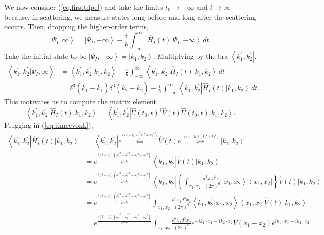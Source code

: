 \documentclass[11pt]{article}
\newcommand{\bra}[1]{\left\langle#1\right|}
\newcommand{\ket}[1]{\left|#1\right\rangle}
\newcommand{\braket}[2]{\left\langle#1|#2\right\rangle}
\newcommand{\op}[1]{\hat{#1}}
\theoremstyle{theorem}
\theoremstyle{remark}
\theoremstyle{step}
\theoremstyle{gap}
\begin{document}
We now consider (\ref{eq.firsttdpe}) and take the limits \(t_0 \to -\infty\) and \(t \to \infty\) because, in scattering, we measure states long before and long after the scattering occurs. Then, dropping the higher-order terms,
\[
\ket{\Psi_I, \infty} = \ket{\Psi_I, -\infty} - \frac{i}{\hbar} \int_{-\infty}^\infty \op{H}_I(t)\ket{\Psi_I, -\infty} \,dt.
\]
Take the initial state to be \(\ket{\Psi_I, -\infty} = \ket{k_1, k_2}\). Multiplying by the bra \(\bra{k_1^\prime, k_2^\prime}\),
\begin{align}
\braket{k_1^\prime, k_2^\prime}{\Psi_I, \infty} &= \braket{k_1^\prime, k_2^\prime}{k_1, k_2} - \frac{i}{\hbar} \int_{-\infty}^\infty \bra{k_1^\prime, k_2^\prime} \op{H}_I(t)\ket{k_1, k_2} \,dt \nonumber\\
&= \delta^3(k_1^\prime - k_1)\delta^3(k_2^\prime - k_2) - \frac{i}{\hbar} \int_{-\infty}^\infty \bra{k_1^\prime, k_2^\prime} \op{H}_I(t)\ket{k_1, k_2} \,dt. \label{eq.intermed}
\end{align}
This motivates us to compute the matrix element
\[
\bra{k_1^\prime, k_2^\prime} \op{H}_I(t)\ket{k_1, k_2} = \bra{k_1^\prime, k_2^\prime} \op{U}(t_0, t)^\dagger \op{V}(t) \op{U}(t_0, t) \ket{k_1, k_2}.
\]
Plugging in (\ref{eq.timeevonk}),
\begin{align*}
\bra{k_1^\prime, k_2^\prime} \op{H}_I(t)\ket{k_1, k_2} &= \bra{k_1^\prime, k_2^\prime} e^{\frac{i\left(t-t_0\right)\left({k_1^\prime}^2 + {k_2^\prime}^2\right)}{2m\hbar}} \op{V}(t) e^{\frac{-i\left(t-t_0\right)\left({k_1}^2 + {k_2}^2\right)}{2m\hbar}} \ket{k_1, k_2} \\
&= e^{\frac{i\left(t-t_0\right)\left({k_1^\prime}^2 + {k_2^\prime}^2 - {k_1}^2 - {k_2}^2\right)}{2m\hbar}} \bra{k_1^\prime, k_2^\prime} \op{V}(t) \ket{k_1, k_2} \\
&= e^{\frac{i\left(t-t_0\right)\left({k_1^\prime}^2 + {k_2^\prime}^2 - {k_1}^2 - {k_2}^2\right)}{2m\hbar}} \bra{k_1^\prime, k_2^\prime} \left\{\int_{x_1, x_2} \frac{d^3 x_1 d^3 x_2}{(2\pi)^6}\ket{x_1, x_2}\bra{x_1, x_2}\right\}\op{V}(t) \ket{k_1, k_2} \\
&= e^{\frac{i\left(t-t_0\right)\left({k_1^\prime}^2 + {k_2^\prime}^2 - {k_1}^2 - {k_2}^2\right)}{2m\hbar}}  \int_{x_1, x_2} \frac{d^3 x_1 d^3 x_2}{(2\pi)^6}\braket{k_1^\prime, k_2^\prime}{x_1, x_2}\bra{x_1, x_2}\op{V}(t) \ket{k_1, k_2} \\
&= e^{\frac{i\left(t-t_0\right)\left({k_1^\prime}^2 + {k_2^\prime}^2 - {k_1}^2 - {k_2}^2\right)}{2m\hbar}}  \int_{x_1, x_2} \frac{d^3 x_1 d^3 x_2}{(2\pi)^6}e^{-ik_1^\prime\cdot x_1 - ik_2^\prime\cdot x_2}V(x_1 - x_2) e^{ik_1\cdot x_1 + ik_2\cdot x_2} 
\end{align*}
\end{document}
